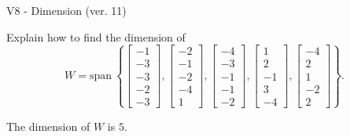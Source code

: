 \begin{exercise}
  \begin{exerciseTitle}V8 - Dimension (ver. 11)\end{exerciseTitle}
  \begin{exerciseStatement}
    Explain how to find the dimension of 
\[W=\mathrm{span}\ \left\{\left[\begin{array}{r}
-1 \\
-3 \\
-3 \\
-2 \\
-3
\end{array}\right] , \left[\begin{array}{r}
-2 \\
-1 \\
-2 \\
-4 \\
1
\end{array}\right] , \left[\begin{array}{r}
-4 \\
-3 \\
-1 \\
-1 \\
-2
\end{array}\right] , \left[\begin{array}{r}
1 \\
2 \\
-1 \\
3 \\
-4
\end{array}\right] , \left[\begin{array}{r}
-4 \\
2 \\
1 \\
-2 \\
2
\end{array}\right]\right\}.\]



  \end{exerciseStatement}
  \begin{exerciseAnswer}
   The dimension of \(W\) is  \(5\).
  


  \end{exerciseAnswer}
\end{exercise}